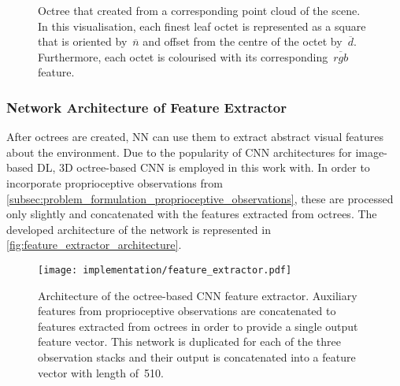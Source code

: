 \begin{figure}[ht]
    \centering
    \caption{Octree that created from a corresponding point cloud of the scene. In this visualisation, each finest leaf octet is represented as a square that is oriented by~\(\overline{n}\) and offset from the centre of the octet by~\(\overline{d}\). Furthermore, each octet is colourised with its corresponding~\(\overline{rgb}\) feature.}
    \label{fig:octree_visualisation}
\end{figure}


\subsubsection{Network Architecture of Feature Extractor}

After octrees are created, NN can use them to extract abstract visual features about the environment. Due to the popularity of CNN architectures for image-based DL, 3D octree-based CNN is employed in this work with. In order to incorporate proprioceptive observations from \autoref{subsec:problem_formulation_proprioceptive_observations}, these are processed only slightly and concatenated with the features extracted from octrees. The developed architecture of the network is represented in \autoref{fig:feature_extractor_architecture}.

\begin{figure}[ht]
    \centering
    \texttt{[image: implementation/feature\_extractor.pdf]}
    \caption{Architecture of the octree-based CNN feature extractor. Auxiliary features from proprioceptive observations are concatenated to features extracted from octrees in order to provide a single output feature vector. This network is duplicated for each of the three observation stacks and their output is concatenated into a feature vector with length of~510.}
    \label{fig:feature_extractor_architecture}
\end{figure}

